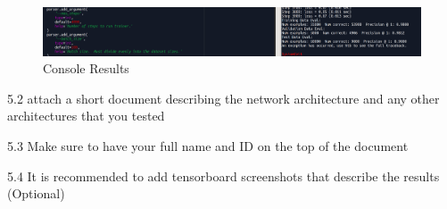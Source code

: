\documentclass[12pt]{article}
\begin{document}
\begin{figure}
  \includegraphics[width=\linewidth]{spyder-console.png}
  \caption{Console Results}
  \label{fig:boat1}
\end{figure}

	5.2 attach a short document describing the network architecture and any other architectures that you tested

	5.3 Make sure to have your full name and ID on the top of the document

	5.4 It is recommended to add tensorboard screenshots that describe the results (Optional)
	
\end{document}
